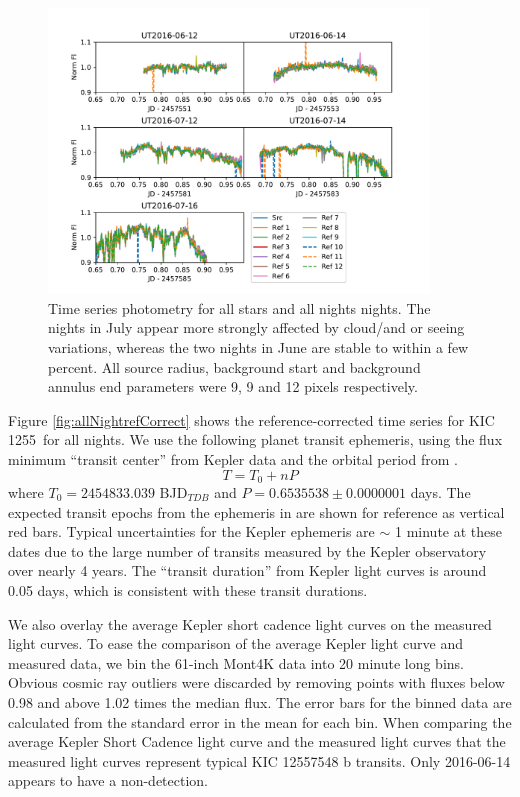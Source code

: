 \documentclass[preprint]{aastex61}
\newcommand{\shStar}{KIC 1255}
\begin{document}
\begin{figure}
\begin{centering}
\includegraphics[width=0.9\textwidth]{images/all_kic1255_phot/all_kic1255_allstar.pdf}
\caption{Time series photometry for all stars and all nights nights.
The nights in July appear more strongly affected by cloud/and or seeing variations, whereas the two nights in June are stable to within a few percent.
All source radius, background start and background annulus end parameters were 9, 9 and 12 pixels respectively.}\label{fig:allNightallStar}
\end{centering}
\end{figure}

Figure \ref{fig:allNightrefCorrect} shows the reference-corrected time series for \shStar\ for all nights.
We use the following planet transit ephemeris, using the flux minimum ``transit center'' from Kepler data \citep{schlawin2016kic1255} and the orbital period from \citet{vanWerkhoven2014}.
\begin{equation}
T = T_0 + n P
\end{equation}
where $T_0 = 2454833.039$ BJD$_{TDB}$ and $P = 0.653 553 8 \pm 0.000 000 1$ days.
The expected transit epochs from the ephemeris in \citep{vanWerkhoven2014} are shown for reference as vertical red bars.
Typical uncertainties for the Kepler ephemeris are $\sim$ 1 minute at these dates due to the large number of transits measured by the Kepler observatory over nearly 4 years.
The ``transit duration'' from Kepler light curves is around 0.05 days, which is consistent with these transit durations.

We also overlay the average Kepler short cadence light curves on the measured light curves.
To ease the comparison of the average Kepler light curve and measured data, we bin the 61-inch Mont4K data into 20 minute long bins.
Obvious cosmic ray outliers were discarded by removing points with fluxes below 0.98 and above 1.02 times the median flux.
The error bars for the binned data are calculated from the standard error in the mean for each bin.
When comparing the average Kepler Short Cadence light curve and the measured light curves that the measured light curves represent typical KIC 12557548 b transits.
Only 2016-06-14 appears to have a non-detection.
\end{document}
